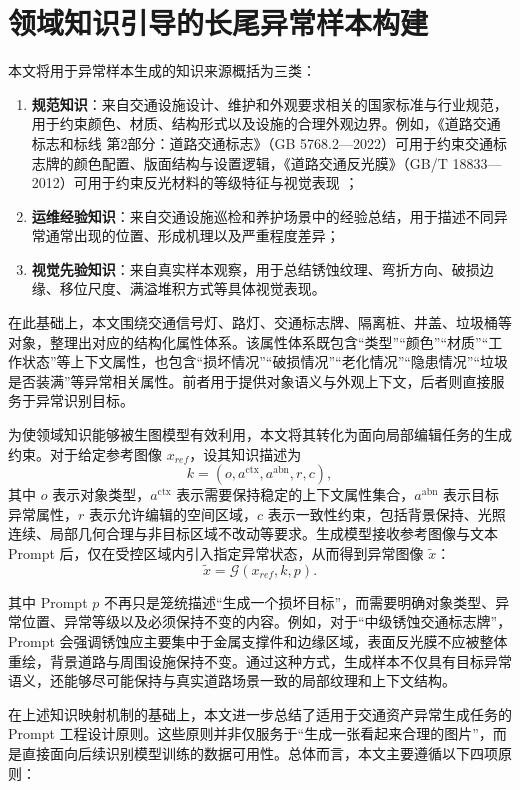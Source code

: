 \section{领域知识引导的长尾异常样本构建}

本文将用于异常样本生成的知识来源概括为三类：
\begin{enumerate}
    \item \textbf{规范知识}：来自交通设施设计、维护和外观要求相关的国家标准与行业规范，用于约束颜色、材质、结构形式以及设施的合理外观边界。例如，《道路交通标志和标线 第2部分：道路交通标志》（GB 5768.2—2022）可用于约束交通标志牌的颜色配置、版面结构与设置逻辑，《道路交通反光膜》（GB/T 18833—2012）可用于约束反光材料的等级特征与视觉表现 \cite{gb5768_2022, gbt18833_2012}；
    \item \textbf{运维经验知识}：来自交通设施巡检和养护场景中的经验总结，用于描述不同异常通常出现的位置、形成机理以及严重程度差异；
    \item \textbf{视觉先验知识}：来自真实样本观察，用于总结锈蚀纹理、弯折方向、破损边缘、移位尺度、满溢堆积方式等具体视觉表现。
\end{enumerate}

在此基础上，本文围绕交通信号灯、路灯、交通标志牌、隔离桩、井盖、垃圾桶等对象，整理出对应的结构化属性体系。该属性体系既包含“类型”“颜色”“材质”“工作状态”等上下文属性，也包含“损坏情况”“破损情况”“老化情况”“隐患情况”“垃圾是否装满”等异常相关属性。前者用于提供对象语义与外观上下文，后者则直接服务于异常识别目标。

为使领域知识能够被生图模型有效利用，本文将其转化为面向局部编辑任务的生成约束。对于给定参考图像 $x_{ref}$，设其知识描述为
\[
 k=(o, a^{\mathrm{ctx}}, a^{\mathrm{abn}}, r, c),
\]
其中 $o$ 表示对象类型，$a^{\mathrm{ctx}}$ 表示需要保持稳定的上下文属性集合，$a^{\mathrm{abn}}$ 表示目标异常属性，$r$ 表示允许编辑的空间区域，$c$ 表示一致性约束，包括背景保持、光照连续、局部几何合理与非目标区域不改动等要求。生成模型接收参考图像与文本 Prompt 后，仅在受控区域内引入指定异常状态，从而得到异常图像 $\tilde{x}$：
\[
\tilde{x} = \mathcal{G}(x_{ref}, k, p).
\]

其中 Prompt $p$ 不再只是笼统描述“生成一个损坏目标”，而需要明确对象类型、异常位置、异常等级以及必须保持不变的内容。例如，对于“中级锈蚀交通标志牌”，Prompt 会强调锈蚀应主要集中于金属支撑件和边缘区域，表面反光膜不应被整体重绘，背景道路与周围设施保持不变。通过这种方式，生成样本不仅具有目标异常语义，还能够尽可能保持与真实道路场景一致的局部纹理和上下文结构。

在上述知识映射机制的基础上，本文进一步总结了适用于交通资产异常生成任务的 Prompt 工程设计原则。这些原则并非仅服务于“生成一张看起来合理的图片”，而是直接面向后续识别模型训练的数据可用性。总体而言，本文主要遵循以下四项原则：


